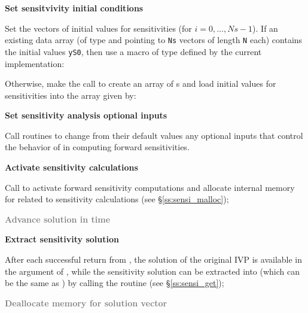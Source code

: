 \begin{Steps}
\item
  {\bf Set sensitvivity initial conditions}

  Set the  vectors  of  initial values
  for sensitivities (for $i=0,\ldots,Ns-1$). 
  If an existing data array  (of type  and pointing to
  {\tt Ns} vectors of length {\tt N} each) contains the initial values
  {\tt yS0}, then use a macro of type  defined by the current 
  {\nvector} implementation:

  {\s} 

  {\p} 

  Otherwise, make the call  
  to create an array of s and load initial values for 
  sensitivities  into the array given by:

  {\s} 

  {\p} 
  
\item
  {\bf Set sensitivity analysis optional inputs}

  Call  routines to change from their default values any
  optional inputs that control the behavior of {\cvodes} in computing forward 
  sensitivities.

\item
  {\bf Activate sensitivity calculations}

  Call \id{(\ldots);} to activate forward 
  sensitivity computations and allocate internal
  memory for {\cvodes} related to sensitivity calculations
  (see \S\ref{ss:sensi_malloc});

\item
  \textcolor{gray}{\bf Advance solution in time}

\item
  {\bf Extract sensitivity solution}

  After each successful return from , the solution of the
  original IVP is available in the  argument of ,
  while the sensitivity solution can be extracted into  (which can 
  be the same as ) by calling the routine 
  (see \S\ref{ss:sensi_get});

\item
  \textcolor{gray}{\bf Deallocate memory for solution vector}


\end{Steps}
